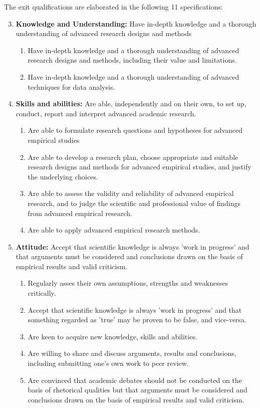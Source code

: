 \documentclass[a4paper,12pt]{report}
\begin{document}
\noindent The exit qualifications are elaborated in the following 11 specifications:
\begin{enumerate}
	\setcounter{enumi}{2}
	\item{\textbf{Knowledge and Understanding:} Have in-depth knowledge and a thorough understanding of advanced research designs and methods}
	\begin{enumerate}
		\item{Have in-depth knowledge and a thorough understanding of advanced research designs and methods, including their value and limitations.}
		\item{Have in-depth knowledge and a thorough understanding of advanced techniques for data analysis.}
	\end{enumerate}
	\item{\textbf{Skills and abilities:} Are able, independently and on their own, to set up, conduct, report and interpret advanced academic research.}
	\begin{enumerate}
		\item{Are able to formulate research questions and hypotheses for advanced empirical studies}
		\item{Are able to develop a research plan, choose appropriate and suitable research designs and methods for advanced empirical studies, and justify the underlying choices.}
		\item{Are able to assess the validity and reliability of advanced empirical research, and to judge the scientific and professional value of findings from advanced empirical research.}
		\item{Are able to apply advanced empirical research methods.} 
	\end{enumerate}
	\setcounter{enumi}{5}
	\item{\textbf{Attitude:} Accept that scientific knowledge is always 'work in progress' and that arguments must be considered and conclusions drawn on the basis of empirical results and valid criticism.}
	\begin{enumerate}
		\item{Regularly asses their own assumptions, strengths and weaknesses critically.}
		\item{Accept that scientific knowledge is always 'work in progress' and that something regarded as 'true' may be proven to be false, and vice-versa.}
		\item{Are keen to acquire new knowledge, skills and abilities.}
		\item{Are willing to share and discuss arguments, results and conclusions, including submitting one's own work to peer review.}
		\item{Are convinced that academic debates should not be conducted on the basis of rhetorical qualities but that arguments must be considered and conclusions drawn on the basis of empirical results and valid criticism.}
	\end{enumerate}
\end{enumerate}
\end{document}
